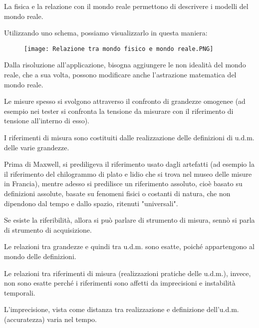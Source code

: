 La fisica e la relazione con il mondo reale permettono di descrivere i modelli del mondo reale. \newline 

Utilizzando uno schema, possiamo visualizzarlo in questa maniera: 

\begin{figure}[h]
    \centering
    \texttt{[image: Relazione tra mondo fisico e mondo reale.PNG]}
\end{figure} 


Dalla risoluzione all'applicazione, bisogna aggiungere le non idealità del mondo reale, che a sua volta, possono modificare anche l'astrazione matematica del mondo reale. \newline 

Le misure spesso si svolgono attraverso il confronto di grandezze omogenee (ad esempio nei tester si confronta la tensione da misurare con il riferimento di tensione all'interno di esso). \newline 

I riferimenti di misura sono costituiti dalle realizzazione delle definizioni di u.d.m. delle varie grandezze. \newline 

Prima di Maxwell, si prediligeva il riferimento usato dagli artefatti (ad esempio la il riferimento del chilogrammo di plato e lidio che si trova nel museo delle misure in Francia), 
mentre adesso si predilisce un riferimento assoluto, cioè basato su definizioni assolute, basate su fenomeni fisici o costanti di 
natura, che non dipendono dal tempo e dallo spazio, ritenuti "universali". \newline 

Se esiste la riferibilità, allora si può parlare di strumento di misura, sennò si parla di strumento di acquisizione. \newline 

Le relazioni tra grandezze e quindi tra u.d.m. sono esatte, poiché appartengono al mondo delle definizioni. \newline 

Le relazioni tra riferimenti di misura (realizzazioni pratiche delle u.d.m.), invece, 
non sono esatte perché i riferimenti sono affetti da imprecisioni e instabilità temporali. \newline 

L'imprecisione, vista come distanza tra realizzazione e definizione dell'u.d.m. (accuratezza) varia nel tempo. \newline 

